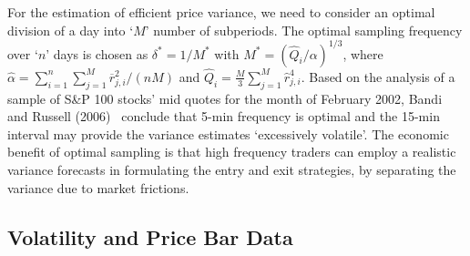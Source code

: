For the estimation of efficient price variance, we need to consider an  optimal division of a day into `$M$' number of subperiods. The optimal sampling frequency over `$n$' days is chosen as $\delta^* = 1/M^*$ with $M^*= (\hat{Q}_i/\alpha)^{1/3}$, where $\hat{\alpha} = \sum_{i=1}^n \sum_{j=1}^M \overline{r}_{j,i}^2 / (nM)$ and $\hat{Q}_i = \frac{M}{3} \sum_{j=1}^M \hat{r}_{j,i}^4$. Based on the analysis of a sample of S\&P 100 stocks' mid quotes for the month of February 2002, Bandi and Russell (2006)~\cite{bandi} conclude that 5-min frequency is optimal and the 15-min interval may provide the variance estimates `excessively volatile'. The economic benefit of optimal sampling is that high frequency traders can employ a realistic variance forecasts in formulating the entry and exit strategies, by separating the variance due to market frictions. 



%

\subsection{Volatility and Price Bar Data}

